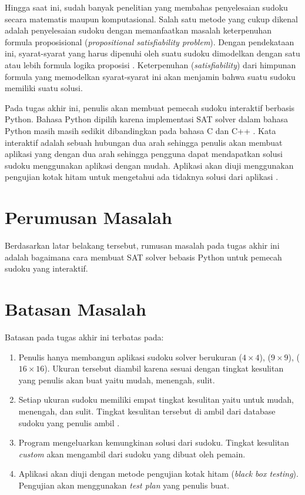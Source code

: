 Hingga saat ini, sudah banyak penelitian yang membahas penyelesaian sudoku secara
matematis maupun komputasional. Salah satu metode yang cukup dikenal adalah penyelesaian
sudoku dengan memanfaatkan masalah keterpenuhan formula proposisional (\textit{propositional satisfiability problem}). Dengan pendekataan ini, syarat-syarat yang
harus dipenuhi oleh suatu sudoku dimodelkan dengan satu atau lebih formula logika proposisi \cite{KJ06,LO06}.
Keterpenuhan (\textit{satisfiability}) dari himpunan formula yang memodelkan syarat-syarat
ini akan menjamin bahwa suatu sudoku memiliki suatu solusi.

Pada tugas akhir ini, penulis akan membuat pemecah sudoku interaktif berbasis Python. Bahasa Python dipilih
karena implementasi SAT solver dalam bahasa Python masih masih sedikit dibandingkan pada bahasa C dan C++ \cite{SATPy1}. Kata interaktif adalah sebuah hubungan dua arah \cite{inte}  sehingga penulis akan membuat aplikasi yang  dengan dua arah sehingga pengguna dapat mendapatkan solusi sudoku menggunakan aplikasi dengan mudah.  Aplikasi akan diuji menggunakan pengujian kotak hitam untuk mengetahui ada tidaknya solusi dari aplikasi \cite{TEST1}.

\section{Perumusan Masalah}

Berdasarkan latar belakang tersebut, rumusan masalah pada tugas akhir ini
adalah bagaimana cara membuat SAT solver bebasis Python untuk pemecah sudoku yang interaktif.

\section{Batasan Masalah}

Batasan pada tugas akhir ini terbatas pada:
\begin{enumerate}
	\item Penulis hanya membangun aplikasi sudoku solver berukuran ($4\times4$), ($9\times9$), ($16\times16$). Ukuran tersebut diambil karena sesuai dengan tingkat kesulitan yang penulis akan buat yaitu mudah, menengah, sulit.
	\item Setiap ukuran sudoku memiliki empat tingkat kesulitan yaitu untuk mudah, menengah, dan sulit. Tingkat kesulitan tersebut di ambil dari database sudoku  yang penulis ambil \cite{SAT423}. 
	\item Program mengeluarkan kemungkinan solusi dari sudoku. Tingkat kesulitan \textit{custom} akan mengambil dari sudoku yang dibuat oleh pemain.
	\item Aplikasi akan diuji dengan metode
	pengujian kotak hitam (\textit{black box testing}). Pengujian akan menggunakan \textit{test plan} yang penulis buat.
\end{enumerate}

